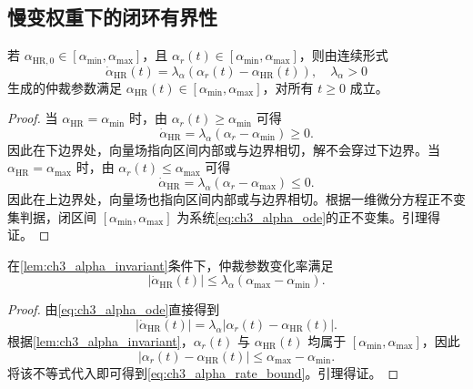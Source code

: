 \subsection{慢变权重下的闭环有界性}
\label{subsec:ch3_timevarying_theory}

\begin{lemma}[仲裁参数的区间不变性]
\label{lem:ch3_alpha_invariant}
若 $\alpha_{\mathrm{HR},0}\in[\alpha_{\min},\alpha_{\max}]$，且 $\alpha_r(t)\in[\alpha_{\min},\alpha_{\max}]$，则由连续形式
\begin{equation}
  \dot\alpha_{\mathrm{HR}}(t)=\lambda_\alpha(\alpha_r(t)-\alpha_{\mathrm{HR}}(t)),\quad \lambda_\alpha>0
  \label{eq:ch3_alpha_ode}
\end{equation}
生成的仲裁参数满足 $\alpha_{\mathrm{HR}}(t)\in[\alpha_{\min},\alpha_{\max}]$，对所有 $t\ge0$ 成立。
\end{lemma}

\begin{proof}
当 $\alpha_{\mathrm{HR}}=\alpha_{\min}$ 时，由 $\alpha_r(t)\ge\alpha_{\min}$ 可得
\begin{equation}
  \dot\alpha_{\mathrm{HR}}=\lambda_\alpha(\alpha_r-\alpha_{\min})\ge0 .
\end{equation}
因此在下边界处，向量场指向区间内部或与边界相切，解不会穿过下边界。当 $\alpha_{\mathrm{HR}}=\alpha_{\max}$ 时，由 $\alpha_r(t)\le\alpha_{\max}$ 可得
\begin{equation}
  \dot\alpha_{\mathrm{HR}}=\lambda_\alpha(\alpha_r-\alpha_{\max})\le0 .
\end{equation}
因此在上边界处，向量场也指向区间内部或与边界相切。根据一维微分方程正不变集判据，闭区间 $[\alpha_{\min},\alpha_{\max}]$ 为系统\eqref{eq:ch3_alpha_ode}的正不变集。引理得证。
\end{proof}

\begin{lemma}[仲裁参数变化率有界性]
\label{lem:ch3_alpha_rate}
在\cref{lem:ch3_alpha_invariant}条件下，仲裁参数变化率满足
\begin{equation}
  |\dot\alpha_{\mathrm{HR}}(t)|\le \lambda_\alpha(\alpha_{\max}-\alpha_{\min}) .
  \label{eq:ch3_alpha_rate_bound}
\end{equation}
\end{lemma}

\begin{proof}
由\eqref{eq:ch3_alpha_ode}直接得到
\begin{equation}
  |\dot\alpha_{\mathrm{HR}}(t)|=\lambda_\alpha|\alpha_r(t)-\alpha_{\mathrm{HR}}(t)| .
\end{equation}
根据\cref{lem:ch3_alpha_invariant}，$\alpha_r(t)$ 与 $\alpha_{\mathrm{HR}}(t)$ 均属于 $[\alpha_{\min},\alpha_{\max}]$，因此
\begin{equation}
  |\alpha_r(t)-\alpha_{\mathrm{HR}}(t)|\le \alpha_{\max}-\alpha_{\min} .
\end{equation}
将该不等式代入即可得到\eqref{eq:ch3_alpha_rate_bound}。引理得证。
\end{proof}

